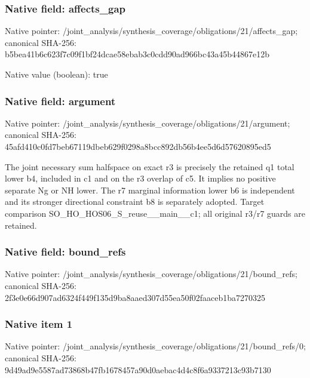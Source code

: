 \documentclass[10pt,a4paper]{article}
\begin{document}
\subsubsection{Native field: affects\_\allowbreak{}gap}
Native pointer: /joint\_\allowbreak{}analysis/synthesis\_\allowbreak{}coverage/obligations/21/affects\_\allowbreak{}gap; canonical SHA-256: b5bea41b6c623f7c09f1bf24dcae58ebab3c0cdd90ad966bc43a45b44867e12b

Native value (boolean): true

\subsubsection{Native field: argument}
Native pointer: /joint\_\allowbreak{}analysis/synthesis\_\allowbreak{}coverage/obligations/21/argument; canonical SHA-256: 45afd410c0fd7beb67119dbeb629f0298a8bcc892db56b4ee5d6d57620895ed5

\begingroup\raggedright\sloppy The joint necessary sum halfspace on exact r3 is precisely the retained q1 total lower b4,\allowbreak{} included in c1 and on the r3 overlap of c5. It implies no positive separate Ng or NH lower. The r7 marginal information lower b6 is independent and its stronger directional constraint b8 is separately adopted. Target comparison SO\_\allowbreak{}HO\_\allowbreak{}HOS06\_\allowbreak{}S\_\allowbreak{}reuse\_\allowbreak{}\_\allowbreak{}main\_\allowbreak{}\_\allowbreak{}c1;\allowbreak{} all original r3/\allowbreak{}r7 guards are retained.\par\endgroup

\subsubsection{Native field: bound\_\allowbreak{}refs}
Native pointer: /joint\_\allowbreak{}analysis/synthesis\_\allowbreak{}coverage/obligations/21/bound\_\allowbreak{}refs; canonical SHA-256: 2f3e0e66d907ad6324f449f135d9ba8aaed307d55ea50f02faaceb1ba7270325

\subsubsection{Native item 1}
Native pointer: /joint\_\allowbreak{}analysis/synthesis\_\allowbreak{}coverage/obligations/21/bound\_\allowbreak{}refs/0; canonical SHA-256: 9d49ad9e5587ad73868b47fb1678457a90d0aebac4d4c8f6a9337213c93b7130
\end{document}
